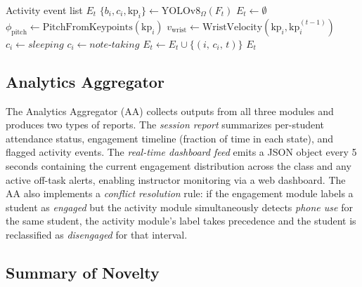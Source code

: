 \documentclass[preprint,12pt]{elsarticle}
\begin{document}
\begin{algorithm}[H]
    \caption{YOLOv8-nano Classroom Activity Detection}
    \begin{algorithmic}[1]
         Activity event list $E_t$
        \State $\{b_i, c_i, \text{kp}_i\} \gets \text{YOLOv8}_\Omega(F_t)$ 
        \State $E_t \gets \emptyset$
                \State $\phi_\text{pitch} \gets \text{PitchFromKeypoints}(\text{kp}_i)$
                \State $v_\text{wrist} \gets \text{WristVelocity}(\text{kp}_i, \text{kp}_i^{(t-1)})$
                    \State $c_i \gets \textit{sleeping}$
                \Else
                    \State $c_i \gets \textit{note-taking}$
                \EndIf
            \EndIf
            \State $E_t \gets E_t \cup \{(i,\, c_i,\, t)\}$
        \EndFor
        \State \Return $E_t$
        \EndProcedure
    \end{algorithmic}
    \label{algo3}
\end{algorithm}

\subsection{Analytics Aggregator}

The Analytics Aggregator (AA) collects outputs from all three modules and produces two types of reports. The \textit{session report} summarizes per-student attendance status, engagement timeline (fraction of time in each state), and flagged activity events. The \textit{real-time dashboard feed} emits a JSON object every 5\,seconds containing the current engagement distribution across the class and any active off-task alerts, enabling instructor monitoring via a web dashboard. The AA also implements a \textit{conflict resolution} rule: if the engagement module labels a student as \textit{engaged} but the activity module simultaneously detects \textit{phone use} for the same student, the activity module's label takes precedence and the student is reclassified as \textit{disengaged} for that interval.

\subsection{Summary of Novelty}
\end{document}
